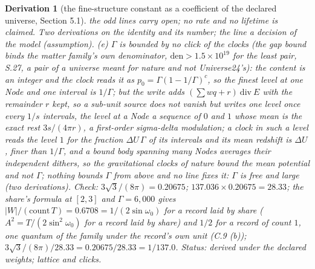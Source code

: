 \documentclass[pdflatex,sn-mathphys-num]{sn-jnl}
\newcommand{\den}{\mathrm{den}}
\newcommand{\ddiv}{\ \mathrm{div}\ }
\theoremstyle{thmstyleone}
\newtheorem{derivation}{Derivation}
\begin{document}
\begin{derivation}[the fine-structure constant as a coefficient of the declared universe, Section 5.1]
the odd lines carry open; no rate and no lifetime is claimed. Two derivations on the identity and its number; the line a decision of the model (assumption). (e) $\Gamma$ is bounded by no click of the clocks (the gap bound binds the matter family's own denominator, $\den > 1.5 \times 10^{19}$ for the least pair, S.27, a pair of a universe meant for nature and not Universe24's): the content is an integer and the clock reads it as $p_0 = \Gamma(1 - 1 / \Gamma)^c$, so the finest level at one Node and one interval is $1 / \Gamma$; but the write adds $(\sum wq + r) \ddiv E$ with the remainder $r$ kept, so a sub-unit source does not vanish but writes one level once every $1 / s$ intervals, the level at a Node a sequence of $0$ and $1$ whose mean is the exact rest $3s / (4\pi r)$, a first-order sigma-delta modulation; a clock in such a level reads the level $1$ for the fraction $\Delta U\,\Gamma$ of its intervals and its mean redshift is $\Delta U$, finer than $1 / \Gamma$, and a bound body spanning many Nodes averages their independent dithers, so the gravitational clocks of nature bound the mean potential and not $\Gamma$; nothing bounds $\Gamma$ from above and no line fixes it: $\Gamma$ is free and large (two derivations). \emph{Check:} $3\sqrt 3 / (8\pi) = 0.20675$; $137.036 \times 0.20675 = 28.33$; the share's formula at $[2, 3]$ and $\Gamma = 6{,}000$ gives $|W| / (\mathrm{count}\,T) = 0.6708 = 1 / (2\sin\omega_0)$ for a record laid by share ($A^2 = T / (2\sin^2\omega_0)$ for a record laid by share) and $1 / 2$ for a record of count $1$, one quantum of the family under the record's own unit (C.9 (b)); $3\sqrt 3 / (8\pi) / 28.33 = 0.20675 / 28.33 = 1 / 137.0$.
 \emph{Status:} derived under the declared weights; lattice and clicks.
\end{derivation}
\end{document}

